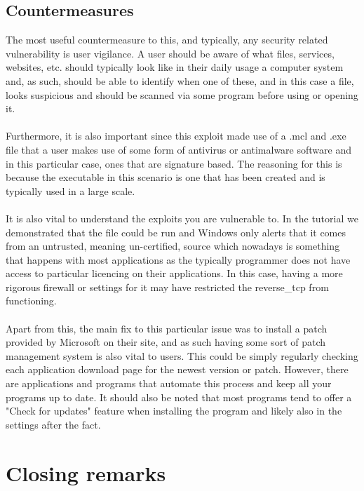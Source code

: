 \documentclass[a4paper, 12pt, titlepage]{report}
\begin{document}
\section{Countermeasures}
The most useful countermeasure to this, and typically, any security related vulnerability is user vigilance. A user should be aware of what files, services, websites, etc. should typically look like in their daily usage a computer system and, as such, should be able to identify when one of these, and in this case a file, looks suspicious and should be scanned via some program before using or opening it.
\\\\
Furthermore, it is also important since this exploit made use of a .mcl and .exe file that a user makes use of some form of antivirus or antimalware software and in this particular case, ones that are signature based. The reasoning for this is because the executable in this scenario is one that has been created and is typically used in a large scale. 
\\\\
It is also vital to understand the exploits you are vulnerable to. In the tutorial we demonstrated that the file could be run and Windows only alerts that it comes from an untrusted, meaning un-certified, source which nowadays is something that happens with most applications as the typically programmer does not have access to particular licencing on their applications. In this case, having a more rigorous firewall or settings for it may have restricted the reverse\_tcp from functioning.
\\\\
Apart from this, the main fix to this particular issue was to install a patch provided by Microsoft on their site, and as such having some sort of patch management system is also vital to users. This could be simply regularly checking each application download page for the newest version or patch. However, there are applications and programs that automate this process and keep all your programs up to date. It should also be noted that most programs tend to offer a "Check for updates" feature when installing the program and likely also in the settings after the fact. 
\chapter{Closing remarks}
\end{document}
